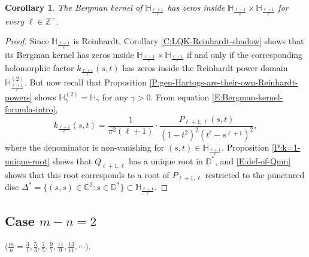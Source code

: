 \documentclass[letterpaper,11pt,reqno]{amsart}
\theoremstyle{plain}
\newtheorem{corollary}[equation]{Corollary}
\theoremstyle{definition}
\theoremstyle{remark}
\theoremstyle{remark}
\numberwithin{equation}{section}
\newcommand{\C}{{\mathbb C}}
\newcommand{\D}{{\mathbb D}}
\newcommand{\h}{{\mathbb H}}
\newcommand{\Z}{{\mathbb Z}}
\begin{document}
\begin{corollary}\label{C:LQK-k=1}
The Bergman kernel of $\h_{\frac{\ell+1}{\ell}}$ has zeros inside $\h_{\frac{\ell+1}{\ell}} \times \h_{\frac{\ell+1}{\ell}}$ for every $\ell \in \Z^+$.
\end{corollary}
\begin{proof}
Since $\h_{\frac{\ell+1}{\ell}}$ is Reinhardt, Corollary \ref{C:LQK-Reinhardt-shadow} shows that its Bergman kernel has zeros inside $\h_{\frac{\ell+1}{\ell}} \times \h_{\frac{\ell+1}{\ell}}$ if and only if the corresponding holomorphic factor $k_{\frac{\ell+1}{\ell}}(s,t)$ has zeros inside the Reinhardt power domain $\h_{\frac{\ell+1}{\ell}}^{(2)}$.
But now recall that Proposition \ref{P:gen-Hartogs-are-their-own-Reinhardt-powers} shows $\h_\gamma^{(2)} = \h_\gamma$ for any $\gamma > 0$.
From equation \eqref{E:Bergman-kernel-formula-intro},
\begin{equation*}
k_{\frac{\ell+1}{\ell}}(s,t) = \frac{1}{\pi^2(\ell+1)} \cdot \frac{P_{\ell+1,\ell}(s,t)}{(1-t^2)^2(t^{\ell}-s^{\ell+1})^2},
\end{equation*}
where the denominator is non-vanishing for $(s,t) \in \h_{\frac{\ell+1}{\ell}}$.
Proposition \ref{P:k=1-unique-root} shows that $Q_{\ell+1,\ell}$ has a unique root in $\D^*$, and \eqref{E:def-of-Qmn} shows that this root corresponds to a root of $P_{\ell+1,\ell}$ restricted to the punctured disc $\Delta^* = \{(s,s)\in\C^2 : s \in \D^* \} \subset \h_{\frac{\ell+1}{\ell}}$.
\end{proof}


\subsection{Case $m-n=2$}\label{SS:k=2} $\big(\frac{m}{n} = \frac{3}{1}, \frac{5}{3}, \frac{7}{5}, \frac{9}{7}, \frac{11}{9}, \frac{13}{11}, \cdots \big)$.
\end{document}
